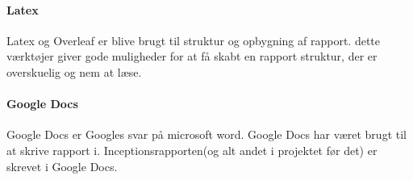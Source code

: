 \paragraph{Latex}
Latex og Overleaf er blive brugt til struktur og opbygning af rapport. dette værktøjer giver gode muligheder for at få skabt en rapport struktur, der er overskuelig og nem at læse. 

\paragraph{Google Docs}
Google Docs er Googles svar på microsoft word. Google Docs har været brugt til at skrive rapport i. Inceptionsrapporten(og alt andet i projektet før det) er skrevet i Google Docs.
